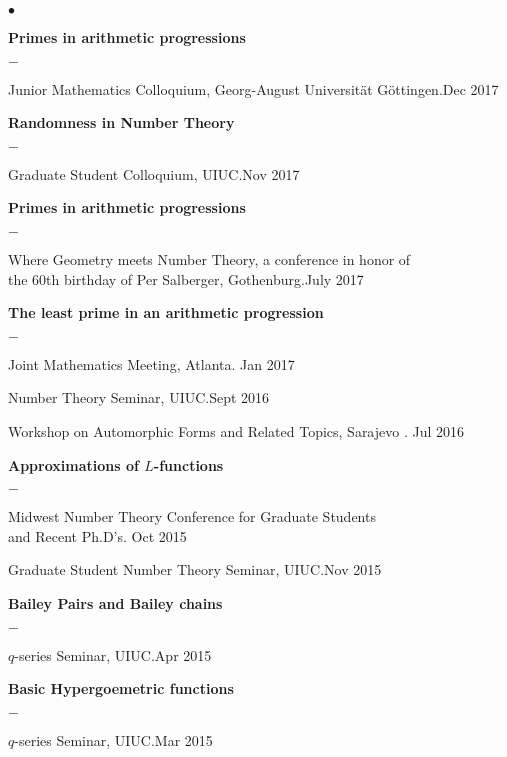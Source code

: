 \documentclass[margin,line,pifont,palatino,courier,10pt]{res}
\newenvironment{list1}{
  \begin{list}{$\bullet$}{%
      \setlength{\itemsep}{0in}
      \setlength{\parsep}{0in} \setlength{\parskip}{0in}
      \setlength{\topsep}{0in} \setlength{\partopsep}{0in}
      \setlength{\leftmargin}{0.17in}}}{\end{list}}
\newenvironment{list2}{
  \begin{list}{$-$}{%
      \setlength{\itemsep}{0in}
      \setlength{\parsep}{0in} \setlength{\parskip}{0in}
      \setlength{\topsep}{0in} \setlength{\partopsep}{0in}
      \setlength{\leftmargin}{0.2in}}}{\end{list}}
\begin{document}
\begin{resume}
\begin{list1}
\item \textbf{Primes in arithmetic progressions} 
\begin{list2}
	\item{Junior Mathematics Colloquium, Georg-August Universit\"at G\"ottingen}.{\hfill Dec 2017}
\end{list2}

\item \textbf{Randomness in Number Theory} 
\begin{list2}
	\item {Graduate Student Colloquium, UIUC}.{\hfill Nov 2017}
\end{list2}


\item \textbf{Primes in arithmetic progressions} 
\begin{list2}
	\item {Where Geometry meets Number Theory, a conference in honor of \\the 60th birthday of Per Salberger, Gothenburg}.{\hfill July 2017}
\end{list2}
	
 \item \textbf{The least prime in an arithmetic progression}
 	\begin{list2}
 		\item Joint Mathematics Meeting, Atlanta. {\hfill Jan 2017}
 		\item Number Theory Seminar, UIUC.{\hfill Sept 2016}
 		\item Workshop on Automorphic Forms and Related Topics, Sarajevo . {\hfill Jul 2016}
 	\end{list2}
\item \textbf{Approximations of $L$-functions} 
 \begin{list2}
 	\item  Midwest Number Theory Conference for Graduate Students \\and Recent Ph.D's. {\hfill Oct 2015}
 	\item Graduate Student Number Theory Seminar, UIUC.{\hfill Nov 2015}
 \end{list2} 
 \item \textbf{ Bailey Pairs and Bailey chains} 
 \begin{list2}
 	\item $q$-series  Seminar, UIUC.{\hfill Apr 2015}
 \end{list2}

 \item \textbf{ Basic Hypergoemetric functions} 
 \begin{list2}
 	\item $q$-series  Seminar, UIUC.{\hfill Mar 2015}
 \end{list2}
\end{list1}


\end{resume}
\end{document}
